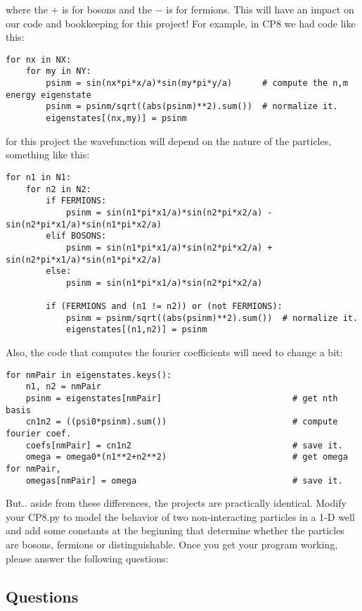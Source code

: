 \documentclass[11pt]{article} %
\begin{document}
where the $+$ is for bosons and the $-$ is for fermions. This will have an impact on our code and bookkeeping for this project! For example, in CP8 we had code like this:

\begin{verbatim}
for nx in NX:
    for my in NY:
        psinm = sin(nx*pi*x/a)*sin(my*pi*y/a)      # compute the n,m energy eigenstate
        psinm = psinm/sqrt((abs(psinm)**2).sum())  # normalize it.
        eigenstates[(nx,my)] = psinm

\end{verbatim}

for this project the wavefunction will depend on the nature of the particles, something like this:

\begin{verbatim}
for n1 in N1:
    for n2 in N2:
        if FERMIONS:
            psinm = sin(n1*pi*x1/a)*sin(n2*pi*x2/a) - sin(n2*pi*x1/a)*sin(n1*pi*x2/a)
        elif BOSONS:
            psinm = sin(n1*pi*x1/a)*sin(n2*pi*x2/a) + sin(n2*pi*x1/a)*sin(n1*pi*x2/a)
        else:
            psinm = sin(n1*pi*x1/a)*sin(n2*pi*x2/a)
            
        if (FERMIONS and (n1 != n2)) or (not FERMIONS):
            psinm = psinm/sqrt((abs(psinm)**2).sum())  # normalize it.
            eigenstates[(n1,n2)] = psinm

\end{verbatim}

Also, the code that computes the fourier coefficients will need to change a bit:

\begin{verbatim}
for nmPair in eigenstates.keys():
    n1, n2 = nmPair
    psinm = eigenstates[nmPair]                          # get nth basis
    cn1n2 = ((psi0*psinm).sum())                         # compute fourier coef.
    coefs[nmPair] = cn1n2                                # save it.
    omega = omega0*(n1**2+n2**2)                         # get omega for nmPair,
    omegas[nmPair] = omega                               # save it.
\end{verbatim}

But.. aside from these differences, the projects are practically identical. Modify your CP8.py to model the behavior of two non-interacting particles in a 1-D well and add some constants at the beginning that determine whether the particles are bosons, fermions or distinguishable. Once you get your program working, please answer the following questions:

\subsection* {Questions}
\end{document}
